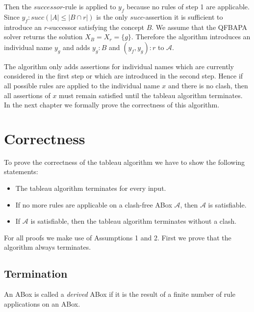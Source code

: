 \documentclass{book}
\theoremstyle{break}
\theoremstyle{definition}
\begin{document}
Then the $successor$-rule is applied to $y_f$ because no rules of step 1 are applicable. Since $y_f:succ(|A|\leq |B\cap r|)$ is the only $succ$-assertion it is sufficient to introduce an $r$-successor satisfying the concept $B$. We assume that the QFBAPA solver returns the solution $X_B=X_r=\{g\}$. Therefore the algorithm introduces an individual name $y_g$ and adds $y_g:B$ and $(y_f,y_g):r$ to $\mathcal{A}$.
\begin{figure}[H]
\centering
{}
\end{figure}
The algorithm only adds assertions for individual names which are currently considered in the first step or which are introduced in the second step. Hence if all possible rules are applied to the individual name $x$ and there is no clash, then all assertions of $x$ must remain satisfied until the tableau algorithm terminates. In the next chapter we formally prove the correctness of this algorithm.
\chapter{Correctness}
To prove the correctness of the tableau algorithm we have to show the following statements:
\begin{itemize}
\item The tableau algorithm terminates for every input.
\item If no more rules are applicable on a clash-free ABox $\mathcal{A}$, then $\mathcal{A}$ is satisfiable.
\item If $\mathcal{A}$ is satisfiable, then the tableau algorithm terminates without a clash.
\end{itemize}
For all proofs we make use of Assumptions 1 and 2. First we prove that the algorithm always terminates.
\section{Termination}
An ABox is called a \textit{derived} ABox if it is the result of a finite number of rule applications on an ABox. \\
\end{document}
